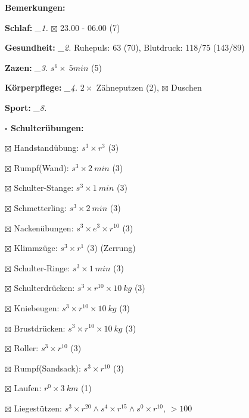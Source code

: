 \documentclass[10pt,a4paper]{article}
\newcommand\prop[1] {{\color {alizarin} {\bf #1}}}             %
\newcommand\mand[1] {{\color {burntorange} {\bf #1}}}          %
\newcommand\topspace{\vskip -15pt \hskip 20pt}
\newcommand\n[1] { {\sl #1.} \hskip 5pt }
\begin{document}
\begin{mdframed}[style=daystyle]
  \begin{labeling}{{\mand {Bemerkungen:}}}
    \setlength\itemsep{-3pt}
  \item[{\mand {Schlaf:}}]        \n{\_1} $\boxtimes$ 23.00 - 06.00 (7)
  \item[{\mand {Gesundheit:}}]    \n{\_2} Ruhepuls: 63 (70), Blutdruck: 118/75 (143/89)
  \item[{\mand {Zazen:}}]         \n{\_3} $s^6 \times\ 5 min$ (5)
  \item[{\mand {Körperpflege:}}]  \n{\_4} $2 \times$ Zähneputzen (2), $\boxtimes$ Duschen
  \item[{\mand {Sport:}}]         \n{\_8}
    \topspace
    \begin{minipage}{0.75\textwidth}  
      \begin{labeling}{\prop {$\square$ {Schulterübungen:}}} 
        \setlength\itemsep{-3pt}
      \item[$\boxtimes$ Handstandübung:]  $s^3 \times r^{3}$ (3)
      \item[$\boxtimes$ Rumpf(Wand):]     $s^3 \times 2\ min$ (3)
      \item[$\boxtimes$ Schulter-Stange:] $s^3 \times 1\ min$ (3)
      \item[$\boxtimes$ Schmetterling:]   $s^3 \times 2\ min$ (3)
      \item[$\boxtimes$ Nackenübungen:]   $s^3 \times e^3 \times r^{10}$ (3)
      \item[$\boxtimes$ Klimmzüge:]       $s^3 \times r^1$ (3) (Zerrung)
      \item[$\boxtimes$ Schulter-Ringe:]  $s^3 \times 1\ min$ (3)
      \item[$\boxtimes$ Schulterdrücken:] $s^3 \times r^{10} \times 10\ kg$ (3)
      \item[$\boxtimes$ Kniebeugen:]      $s^3 \times r^{10} \times 10\ kg$ (3)
      \item[$\boxtimes$ Brustdrücken:]    $s^3 \times r^{10} \times 10\ kg$ (3)
      \item[$\boxtimes$ Roller:]          $s^3 \times r^{10}$ (3)
      \item[$\boxtimes$ Rumpf(Sandsack):] $s^3 \times r^{10}$ (3)
      \item[$\boxtimes$ Laufen:]          $r^0 \times 3\ km$ (1)
      \item[$\boxtimes$ Liegestützen:]    $s^3 \times r^{20} \land s^4 \times r^{15} \land s^0 \times r^{10}$, $> 100$
      \end{labeling}

\end{minipage}
\end{labeling}
\end{mdframed}
\end{document}
